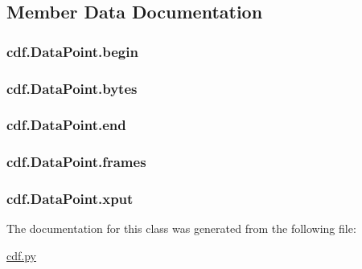 \subsection{Member Data Documentation}
\hypertarget{classcdf_1_1_data_point_ad73a5f02299af4166f516ebcf70aa2be}{
\subsubsection[{begin}]{\setlength{\rightskip}{0pt plus 5cm}cdf.\-Data\-Point.\-begin}}\label{classcdf_1_1_data_point_ad73a5f02299af4166f516ebcf70aa2be}
\hypertarget{classcdf_1_1_data_point_aa098d368a57503bfc327e76f34d211e4}{
\subsubsection[{bytes}]{\setlength{\rightskip}{0pt plus 5cm}cdf.\-Data\-Point.\-bytes}}\label{classcdf_1_1_data_point_aa098d368a57503bfc327e76f34d211e4}
\hypertarget{classcdf_1_1_data_point_a02ee1a6a3e1cad6aaca067751c30952c}{
\subsubsection[{end}]{\setlength{\rightskip}{0pt plus 5cm}cdf.\-Data\-Point.\-end}}\label{classcdf_1_1_data_point_a02ee1a6a3e1cad6aaca067751c30952c}
\hypertarget{classcdf_1_1_data_point_a52817194109fae73a5cc2d7595797a65}{
\subsubsection[{frames}]{\setlength{\rightskip}{0pt plus 5cm}cdf.\-Data\-Point.\-frames}}\label{classcdf_1_1_data_point_a52817194109fae73a5cc2d7595797a65}
\hypertarget{classcdf_1_1_data_point_adc4cd93ff514639bc9bb75301433567a}{
\subsubsection[{xput}]{\setlength{\rightskip}{0pt plus 5cm}cdf.\-Data\-Point.\-xput}}\label{classcdf_1_1_data_point_adc4cd93ff514639bc9bb75301433567a}


The documentation for this class was generated from the following file\-:\begin{DoxyCompactItemize}
\item 
\hyperlink{cdf_8py}{cdf.\-py}\end{DoxyCompactItemize}
